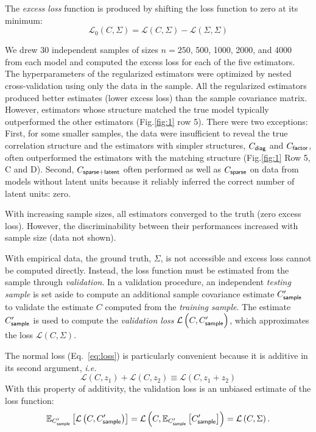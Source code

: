 \documentclass[10pt]{article}
\newcommand{\figref}[2]{Fig.\;\ref{fig:#1}\,#2}
\newcommand{\loss}[1]{\mathcal L\left(#1\right)}
\newcommand{\eloss}[1]{\mathcal L_0\left(#1\right)}
\newcommand{\E}[2][]{\mathbb E_{#1}\left[ #2\right]}    %
\newcommand{\ie}{\emph{i.e.}\;}
\begin{document}
The \emph{excess loss} function is produced by shifting the loss function to zero at its minimum:
\begin{equation}\label{eq:excess-loss}
    \eloss{C,\Sigma} = \loss{C,\Sigma}-\loss{\Sigma,\Sigma}
\end{equation}

We drew 30 independent samples of sizes $n=250$, 500, 1000, 2000, and 4000 from each model and computed the excess loss for each of the five estimators.  The hyperparameters of the regularized estimators were optimized by nested cross-validation using only the data in the sample.  All the regularized estimators produced better estimates (lower excess loss) than the sample covariance matrix.  However, estimators whose structure matched the true model typically outperformed the other estimators (\figref{1}{\,row 5}).  There were two exceptions: First, for some smaller samples, the data were insufficient to reveal the true correlation structure and the estimators with simpler structures, $C_{\sf diag}$ and $C_{\sf factor}$, often outperformed the estimators with the matching structure (\figref{1}{\,Row 5, C and D}).  Second, $C_{\sf sparse+latent}$ often performed as well as $C_{\sf sparse}$ on data from models without latent units because it reliably inferred the correct number of latent units: zero.  

With increasing sample sizes, all estimators converged to the truth (zero excess loss).  However, 
the discriminability between their performances increased with sample size (data not shown).

With empirical data, the ground truth, $\Sigma$, is not accessible and excess loss cannot be computed directly. Instead, the loss function must be estimated from the sample through \emph{validation}.  In a validation procedure, an independent \emph{testing sample} is set aside to compute an additional sample covariance estimate $C_{\sf sample}^\prime$ to validate the estimate $C$ computed from the  \emph{training sample}.   The estimate $C_{\sf sample}^\prime$ is used to 
compute the \emph{validation loss} $\loss{C,C_{\sf sample}^\prime}$, which approximates the loss  $\loss{C,\Sigma}$.

The normal loss (Eq.~\ref{eq:loss}) is particularly convenient because it is additive in its second argument, \ie
 \begin{equation*}\label{eq:additivity}
 \loss{C,z_1} + \loss{C,z_2} \equiv \loss{C,z_1+z_2}
 \end{equation*}
With this property of additivity, the validation loss is an unbiased estimate of the loss function:
\begin{equation*}
    \E[C_{\sf sample}^\prime]{\loss{C,C_{\sf sample}^\prime}}=\loss{C,\E[C_{\sf sample}^\prime]{C_{\sf sample}^\prime}}=\loss{C,\Sigma}.
\end{equation*}
\end{document}

